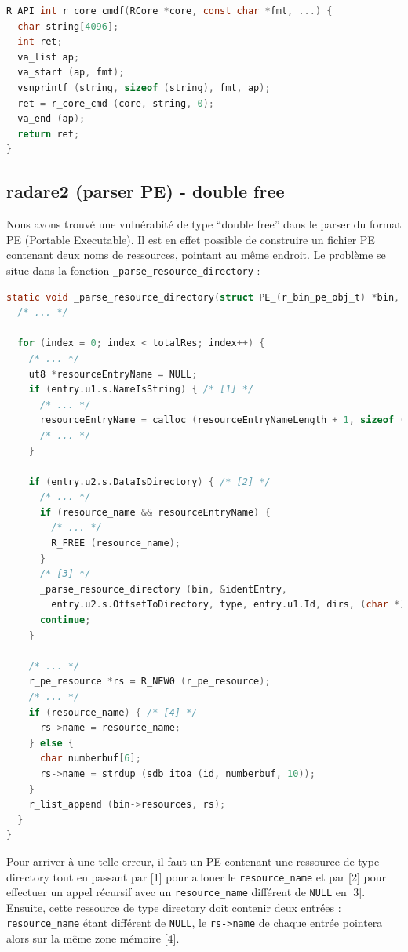 \begin{lstlisting}[language=C]
R_API int r_core_cmdf(RCore *core, const char *fmt, ...) {
  char string[4096];
  int ret;
  va_list ap;
  va_start (ap, fmt);
  vsnprintf (string, sizeof (string), fmt, ap);
  ret = r_core_cmd (core, string, 0);
  va_end (ap);
  return ret;
}
\end{lstlisting}

\subsection{radare2 (parser PE) - double free}

Nous avons trouvé une vulnérabité de type ``double free'' dans le parser du format PE (Portable Executable). Il est en effet possible de construire un fichier PE contenant deux noms de ressources, pointant au même endroit. Le problème se situe dans la fonction \lstinline{_parse_resource_directory} :

\begin{lstlisting}[language=C]
static void _parse_resource_directory(struct PE_(r_bin_pe_obj_t) *bin, Pe_image_resource_directory *dir, ut64 offDir, int type, int id, HtUU *dirs, char *resource_name) {
  /* ... */

  for (index = 0; index < totalRes; index++) {
    /* ... */
    ut8 *resourceEntryName = NULL;
    if (entry.u1.s.NameIsString) { /* [1] */
      /* ... */
      resourceEntryName = calloc (resourceEntryNameLength + 1, sizeof (ut8));
      /* ... */
    }

    if (entry.u2.s.DataIsDirectory) { /* [2] */
      /* ... */
      if (resource_name && resourceEntryName) {
        /* ... */
        R_FREE (resource_name);
      }
      /* [3] */
      _parse_resource_directory (bin, &identEntry,
        entry.u2.s.OffsetToDirectory, type, entry.u1.Id, dirs, (char *)resourceEntryName);
      continue;
    }

    /* ... */
    r_pe_resource *rs = R_NEW0 (r_pe_resource);
    /* ... */
    if (resource_name) { /* [4] */
      rs->name = resource_name;
    } else {
      char numberbuf[6];
      rs->name = strdup (sdb_itoa (id, numberbuf, 10));
    }
    r_list_append (bin->resources, rs);
  }
}
\end{lstlisting}

Pour arriver à une telle erreur, il faut un PE contenant une ressource de type directory tout en passant par [1] pour allouer le \lstinline{resource_name} et par [2] pour effectuer un appel récursif avec un \lstinline{resource_name} différent de \lstinline{NULL} en [3].
Ensuite, cette ressource de type directory doit contenir deux entrées : \lstinline{resource_name} étant différent de \lstinline{NULL}, le \lstinline{rs->name} de chaque entrée pointera alors sur la même zone mémoire [4].

